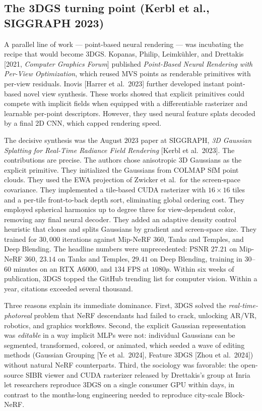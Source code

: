 \subsection{The 3DGS turning point (Kerbl et al., SIGGRAPH 2023)}\label{the-3dgs-turning-point-kerbl-et-al.-siggraph-2023}

A parallel line of work --- point-based neural rendering --- was incubating the recipe that would become 3DGS. Kopanas, Philip, Leimkühler, and Drettakis {[}2021, \emph{Computer Graphics Forum}{]} published \emph{Point-Based Neural Rendering with Per-View Optimization}, which reused MVS points as renderable primitives with per-view residuals. Inovis {[}Harrer et al.~2023{]} further developed instant point-based novel view synthesis. These works showed that explicit primitives could compete with implicit fields when equipped with a differentiable rasterizer and learnable per-point descriptors. However, they used neural feature splats decoded by a final 2D CNN, which capped rendering speed.

The decisive synthesis was the August \(2023\) paper at SIGGRAPH, \emph{3D Gaussian Splatting for Real-Time Radiance Field Rendering} {[}Kerbl et al.~2023{]}. The contributions are precise. The authors chose anisotropic 3D Gaussians as the explicit primitive. They initialized the Gaussians from COLMAP SfM point clouds. They used the EWA projection of Zwicker et al.~for the screen-space covariance. They implemented a tile-based CUDA rasterizer with \(16{\times}16\) tiles and a per-tile front-to-back depth sort, eliminating global ordering cost. They employed spherical harmonics up to degree three for view-dependent color, removing any final neural decoder. They added an adaptive density control heuristic that clones and splits Gaussians by gradient and screen-space size. They trained for \(30{,}000\) iterations against Mip-NeRF 360, Tanks and Temples, and Deep Blending. The headline numbers were unprecedented: PSNR \(27.21\) on Mip-NeRF 360, \(23.14\) on Tanks and Temples, \(29.41\) on Deep Blending, training in \(30\)--\(60\) minutes on an RTX A6000, and \(134\) FPS at \(1080p\). Within six weeks of publication, 3DGS topped the GitHub trending list for computer vision. Within a year, citations exceeded several thousand.

Three reasons explain its immediate dominance. First, 3DGS solved the \emph{real-time-photoreal} problem that NeRF descendants had failed to crack, unlocking AR/VR, robotics, and graphics workflows. Second, the explicit Gaussian representation was \emph{editable} in a way implicit MLPs were not: individual Gaussians can be segmented, transformed, colored, or animated, which seeded a wave of editing methods (Gaussian Grouping {[}Ye et al.~2024{]}, Feature 3DGS {[}Zhou et al.~2024{]}) without natural NeRF counterparts. Third, the sociology was favorable: the open-source SIBR viewer and CUDA rasterizer released by Drettakis's group at Inria let researchers reproduce 3DGS on a single consumer GPU within days, in contrast to the months-long engineering needed to reproduce city-scale Block-NeRF.

